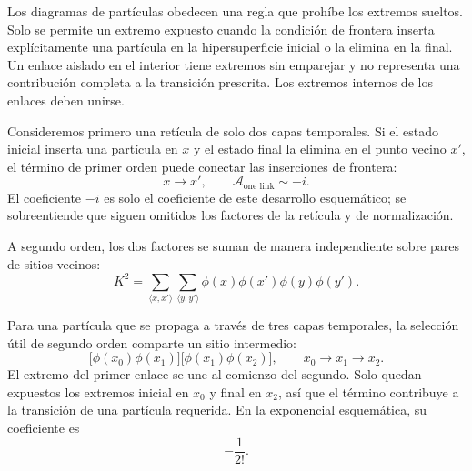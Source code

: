 Los diagramas de partículas obedecen una regla que prohíbe los extremos sueltos. Solo se permite un extremo expuesto cuando la condición de frontera inserta explícitamente una partícula en la hipersuperficie inicial o la elimina en la final. Un enlace aislado en el interior tiene extremos sin emparejar y no representa una contribución completa a la transición prescrita. Los extremos internos de los enlaces deben unirse.

Consideremos primero una retícula de solo dos capas temporales. Si el estado inicial inserta una partícula en \(x\) y el estado final la elimina en el punto vecino \(x'\), el término de primer orden puede conectar las inserciones de frontera:
\begin{equation}
x\longrightarrow x',
\qquad
\mathcal{A}_{\text{one link}}\sim -i.
\end{equation}
El coeficiente \(-i\) es solo el coeficiente de este desarrollo esquemático; se sobreentiende que siguen omitidos los factores de la retícula y de normalización.

\begin{classroomqa}
\end{classroomqa}

A segundo orden, los dos factores se suman de manera independiente sobre pares de sitios vecinos:
\begin{equation}
K^2
=
\sum_{\langle x,x'\rangle}
\sum_{\langle y,y'\rangle}
\phi(x)\phi(x')\phi(y)\phi(y').
\end{equation}

\begin{classroomqa}
\end{classroomqa}

Para una partícula que se propaga a través de tres capas temporales, la selección útil de segundo orden comparte un sitio intermedio:
\begin{equation}
\bigl[\phi(x_0)\phi(x_1)\bigr]
\bigl[\phi(x_1)\phi(x_2)\bigr],
\qquad
x_0\longrightarrow x_1\longrightarrow x_2.
\end{equation}
El extremo del primer enlace se une al comienzo del segundo. Solo quedan expuestos los extremos inicial en \(x_0\) y final en \(x_2\), así que el término contribuye a la transición de una partícula requerida. En la exponencial esquemática, su coeficiente es
\begin{equation}
-\frac{1}{2!}.
\end{equation}

